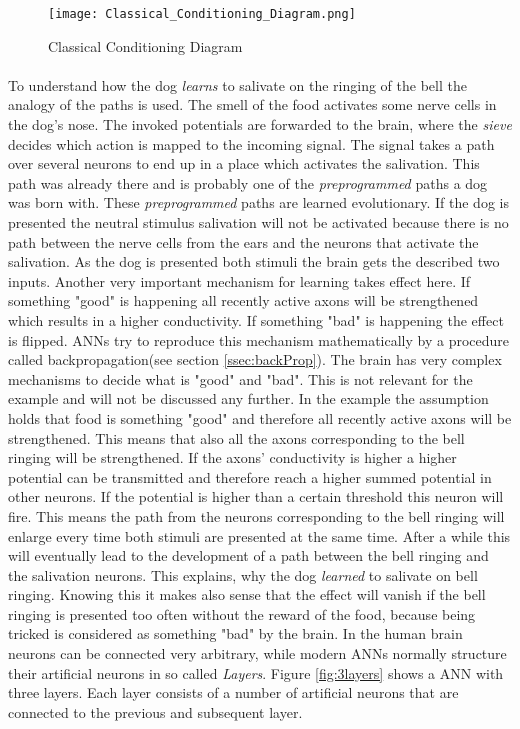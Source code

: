 \begin{figure}
\centering
  \texttt{[image: Classical\_Conditioning\_Diagram.png]}
  \caption{Classical Conditioning Diagram \cite{pavlovsDog}}
  \label{fig:pavlov}
\end{figure}

\paragraph{} %
To understand how the dog \emph{learns} to salivate on the ringing of the bell the analogy of the paths is used.
The smell of the food activates some nerve cells in the dog's nose. The invoked potentials are forwarded to the brain, where the \emph{sieve} decides which action is mapped to the incoming signal. The signal takes a path over several neurons to end up in a place which activates the salivation. 
This path was already there and is probably one of the \emph{preprogrammed} paths a dog was born with. 
These \emph{preprogrammed} paths are learned evolutionary.
If the dog is presented the neutral stimulus salivation will not be activated because there is no path between the nerve cells from the ears and the neurons that activate the salivation.
As the dog is presented both stimuli the brain gets the described two inputs.
Another very important mechanism for learning takes effect here.
If something "good" is happening all recently active axons will be strengthened which results in a higher conductivity.
If something "bad" is happening the effect is flipped.
ANNs try to reproduce this mechanism mathematically by a procedure called backpropagation(see section \ref{ssec:backProp}).
The brain has very complex mechanisms to decide what is "good" and "bad". This is not relevant for the example and will not be discussed any further. 
In the example the assumption holds that food is something "good" and therefore all recently active axons will be strengthened. 
This means that also all the axons corresponding to the bell ringing will be strengthened. 
If the axons' conductivity is higher a higher potential can be transmitted and therefore reach a higher summed potential in other neurons. If the potential is higher than a certain threshold this neuron will fire. 
This means the path from the neurons corresponding to the bell ringing will enlarge every time both stimuli are presented at the same time.
After a while this will eventually lead to the development of a path between the bell ringing and the salivation neurons.
This explains, why the dog \emph{learned} to salivate on bell ringing.
Knowing this it makes also sense that the effect will vanish if the bell ringing is presented too often without the reward of the food, because being tricked is considered as something "bad" by the brain.
In the human brain neurons can be connected very arbitrary, while modern ANNs normally structure their artificial neurons in so called \emph{Layers}.
Figure \ref{fig:3layers} shows a ANN with three layers.
Each layer consists of a number of artificial neurons that are connected to the previous and subsequent layer.

